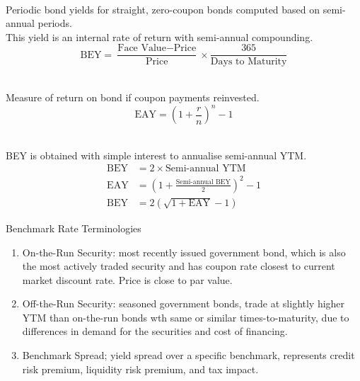 \begin{definition} \\
Periodic bond yields for straight, zero-coupon bonds computed based on semi-annual periods.\\
This yield is an internal rate of return with semi-annual compounding.
\begin{equation}
\text{BEY} = \frac{\text{Face Value} - \text{Price}}{\text{Price}} \times \frac{365}{\text{Days to Maturity}} \nonumber
\end{equation}
\end{definition}

\begin{definition} \\
Measure of return on bond if coupon payments reinvested.
\begin{equation}
\text{EAY} = \left(1 + \frac{r}{n} \right)^n - 1 \nonumber
\end{equation}
\end{definition}

\begin{remark} \\
BEY is obtained with simple interest to annualise semi-annual YTM.
\begin{align}
\text{BEY} &= 2 \times \text{Semi-annual YTM} \nonumber \\
\text{EAY} &= \left(1 + \frac{\text{Semi-annual BEY}}{2} \right)^2 - 1 \nonumber \\
\text{BEY} &= 2(\sqrt{1+\text{EAY}} - 1) \nonumber 
\end{align}
\end{remark}

\begin{definition} Benchmark Rate Terminologies
\begin{enumerate}[label=\roman*.]
\setlength{\itemsep}{0pt}
\item On-the-Run Security: most recently issued government bond, which is also the most actively traded security and has coupon rate closest to current market discount rate. Price is close to par value.
\item Off-the-Run Security: seasoned government bonds, trade at slightly higher YTM than on-the-run bonds wth same or similar times-to-maturity, due to differences in demand for the securities and cost of financing.
\item Benchmark Spread; yield spread over a specific benchmark, represents credit risk premium, liquidity risk premium, and tax impact.
\end{enumerate}
\end{definition}


